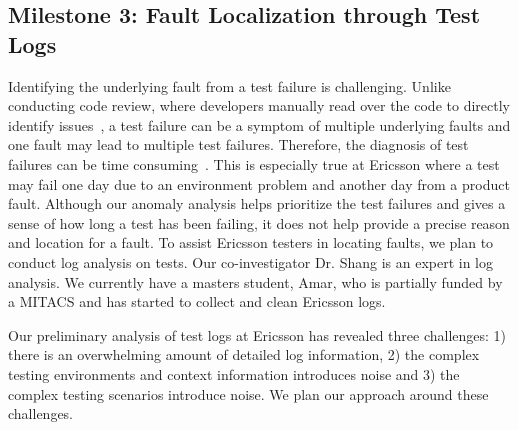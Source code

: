 \subsection{Milestone 3: Fault Localization through Test Logs}
\label{secLogs}

Identifying the underlying fault from a test failure is challenging. Unlike conducting code review, where developers manually read over the code to directly identify issues~\cite{Rigby2014TOSEM}, a test failure can be a symptom of multiple underlying faults and one fault may lead to multiple test failures. Therefore, the diagnosis of test failures can be time consuming~\cite{Glerum:2009:DLT:1629575.1629586}. This is especially true at Ericsson where a test may fail one day due to an environment problem and another day from a product fault. Although our anomaly analysis helps prioritize the test failures and gives a sense of how long a test has been failing, it does not help provide a precise reason and location for a fault.
To assist Ericsson testers in locating faults, we plan to conduct log analysis on tests. Our co-investigator Dr. Shang is an expert in log analysis. We currently have a masters student, Amar, who is partially funded by a MITACS and has started to collect and clean Ericsson logs.

Our preliminary analysis of test logs at Ericsson has revealed three challenges: 1) there is an overwhelming amount of detailed log information, 2) the complex testing environments and context information introduces noise and 3) the complex testing scenarios introduce noise. We plan our approach around these challenges. 

